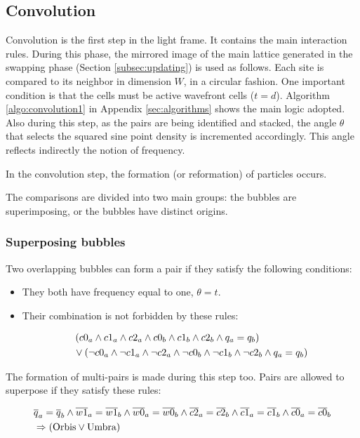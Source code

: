 \documentclass[12pt,english]{article}
\begin{document}
\subsection{Convolution} \label{subsec:convolution}
Convolution is the first step in the light frame. It contains the main interaction rules. During this phase, the mirrored image of the main lattice generated in the swapping phase (Section \ref{subsec:updating}) is used as follows. Each site is compared to its neighbor in dimension $W$, in a circular fashion. One important condition is that the cells must be active wavefront cells ($t=d$). Algorithm \ref{algo:convolution1} in Appendix \ref{sec:algorithms} shows the main logic adopted. Also during this step, as the pairs are being identified and stacked, the angle $\theta$ that selects the squared sine point density is incremented accordingly. This angle reflects indirectly the notion of frequency.

In the convolution step, the formation (or reformation) of particles occurs.

The comparisons are divided into two main groups: the bubbles are superimposing, or the bubbles have distinct origins.

\subsubsection{Superposing bubbles}
Two overlapping bubbles can form a pair if they satisfy the following conditions:
\begin{itemize}
    \item They both have frequency equal to one, $\theta=t$.
    \item Their combination is not forbidden by these rules:
    
\begin{align}
    &\left( c0_a \wedge c1_a \wedge c2_a \wedge c0_b \wedge c1_b \wedge c2_b \wedge q_a = q_b \right) \notag \\
    &\vee \left( \neg c0_a \wedge \neg c1_a \wedge \neg c2_a \wedge \neg c0_b \wedge \neg c1_b \wedge \neg c2_b \wedge q_a = q_b \right)
\end{align}

\end{itemize}

The formation of multi-pairs is made during this step too. Pairs are allowed to superpose if they satisfy these rules:

\begin{align}
    &\overline{q}_a = \overline{q}_b \wedge \overline{w1}_a = \overline{w1}_b \wedge \overline{w0}_a = \overline{w0}_b \wedge 
    \overline{c2}_a = \overline{c2}_b \wedge \overline{c1}_a = \overline{c1}_b \wedge \overline{c0}_a = \overline{c0}_b \notag \\
    &\Rightarrow (\text{Orbis} \vee \text{Umbra})
\end{align}
\end{document}
